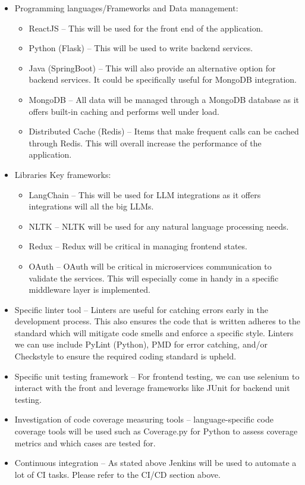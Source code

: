 \documentclass{article}
\begin{document}
\begin{itemize}
  \item Programming languages/Frameworks and Data management:
    \begin{itemize}
      \item ReactJS -- This will be used for the front end of the application.
      \item Python (Flask) -- This will be used to write backend services.
      \item Java (SpringBoot) -- This will also provide an alternative option for backend services. It could be specifically useful for MongoDB integration.
      \item MongoDB -- All data will be managed through a MongoDB database as it offers built-in caching and performs well under load.
      \item Distributed Cache (Redis) -- Items that make frequent calls can be cached through Redis. This will overall increase the performance of the application.
    \end{itemize}
    

  \item Libraries
    Key frameworks:
    \begin{itemize}
      \item LangChain -- This will be used for LLM integrations as it offers integrations will all the big LLMs.
      \item NLTK -- NLTK will be used for any natural language processing needs. 
      \item Redux -- Redux will be critical in managing frontend states.
      \item OAuth -- OAuth will be critical in microservices communication to validate the services. This will especially come in handy in a specific middleware layer is implemented.
    \end{itemize}

  \item Specific linter tool -- Linters are useful for catching errors early in the development process. This also ensures the code that is written adheres to the standard which will mitigate code smells and enforce a specific style. Linters we can use include PyLint (Python), PMD for error catching, and/or Checkstyle to ensure the required coding standard is upheld.
  \item Specific unit testing framework -- For frontend testing, we can use selenium to interact with the front and leverage frameworks like JUnit for backend unit testing.
  \item Investigation of code coverage measuring tools -- language-specific code coverage tools will be used such as Coverage.py for Python to assess coverage metrics and which cases are tested for.
  \item Continuous integration -- As stated above Jenkins will be used to automate a lot of CI tasks. Please refer to the CI/CD section above.


\end{itemize}
\end{document}
